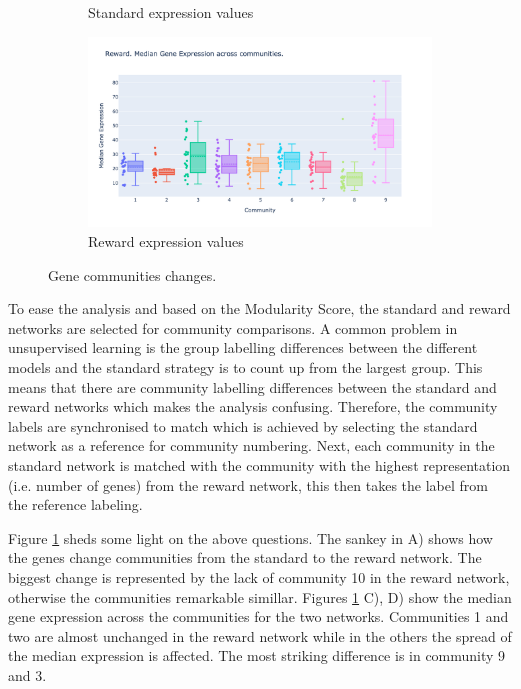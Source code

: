 \begin{figure}[!htb]
\begin{subfigure}[b]{0.47\textwidth}
        \caption{Standard expression values}
    \end{subfigure}
    \hfill
    \begin{subfigure}[b]{0.47\textwidth}
        \centering
        \includegraphics[width=\textwidth,keepaspectratio]{Sections/Network_I/Resources/P0/Comms/P0_norm3_4K_50TF_med.png}
        \caption{Reward expression values}
    \end{subfigure}
    \hfill
    \caption{Gene communities changes.}
    \label{fig:N_I:p0_comm_chgs}
\end{figure}


To ease the analysis and based on the Modularity Score, the standard and reward networks are selected for community comparisons. A common problem in unsupervised learning is the group labelling differences between the different models and the standard strategy is to count up from the largest group. This means that there are community labelling differences between the standard and reward networks which makes the analysis confusing. Therefore, the community labels are synchronised to match which is achieved by selecting the standard network as a reference for community numbering. Next, each community in the standard network is matched with the community with the highest representation (i.e. number of genes) from the reward network, this then takes the label from the reference labeling.

Figure \ref{fig:N_I:p0_comm_chgs} sheds some light on the above questions. The sankey in A) shows 
how the genes change communities from the standard to the reward network. The biggest change is represented by the lack of community 10 in the reward network, otherwise the communities remarkable simillar. Figures \ref{fig:N_I:p0_comm_chgs} C), D) show the median gene expression across the communities for the two networks. Communities 1 and two are almost unchanged in the reward network while in the others the spread of the median expression is affected. The most striking difference is in community 9 and 3.  


